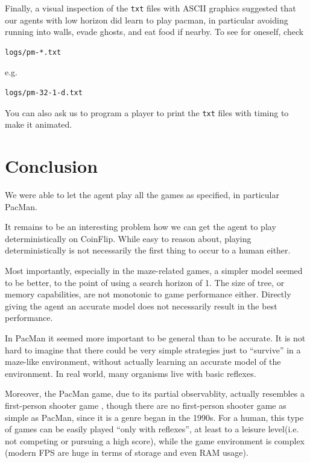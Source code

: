\documentclass{article}
\let\Oldsection\section
\renewcommand{\section}{\FloatBarrier\Oldsection}
\begin{document}
\begin{flushleft}
Finally, a visual inspection of the
\verb|txt| files with ASCII graphics
suggested that our agents
with low horizon did learn to play pacman,
in particular avoiding running into walls,
evade ghosts, and eat food if nearby.
To see for oneself, check 
\begin{verbatim}
logs/pm-*.txt
\end{verbatim}
e.g.
\begin{verbatim}
logs/pm-32-1-d.txt
\end{verbatim}
You can also ask us to program
a player to print the \verb|txt|
files with timing to make it
animated.

\section{Conclusion}

We were able to let the agent play all the games as specified,
in particular PacMan.

It remains to be an interesting problem how we can get the
agent to play deterministically on CoinFlip.
While easy to reason about, playing deterministically
is not necessarily the first thing to occur to a human either.


Most importantly, especially in the maze-related games,
a simpler model seemed to be better, to the point of
using a search horizon of 1.
The size of tree, or memory capabilities, are not
monotonic to game performance either.
Directly giving the agent an accurate model 
does not necessarily result in the best performance.

In PacMan it seemed more important to be general
than to be accurate.
It is not hard to imagine that there could be very simple
strategies just to “survive” in a maze-like environment,
without actually learning an accurate model of the environment.
In real world, many organisms live with basic reflexes.

Moreover, the PacMan game, due to its partial observablity,
actually resembles a first-person shooter game \cite{fps},
though there are no first-person shooter game
as simple as PacMan, since it is a genre began
in the 1990s. For a human, this type of games can be
easily played “only with reflexes”, at 
least to a leisure level(i.e. 
not competing or pursuing a high score), while the game environment
is complex (modern FPS are huge in terms of storage
and even RAM usage).


\end{flushleft}
\end{document}
